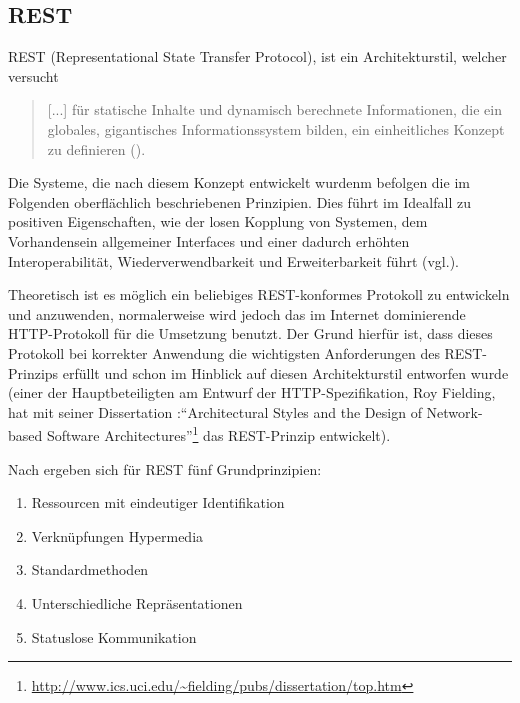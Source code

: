 \subsection{REST}\label{section:rest}
REST (Representational State Transfer Protocol), ist ein Architekturstil, welcher versucht 
\begin{quotation}
[...] für statische Inhalte und dynamisch berechnete Informationen, die ein globales, gigantisches Informationssystem bilden, ein einheitliches Konzept zu definieren (\cite{tilkovrestchapter2}).
\end{quotation}
Die Systeme, die nach diesem Konzept entwickelt wurdenm befolgen die im Folgenden oberflächlich beschriebenen Prinzipien. Dies führt im Idealfall zu positiven Eigenschaften, wie der losen Kopplung von Systemen, dem Vorhandensein allgemeiner Interfaces und einer dadurch erhöhten Interoperabilität, Wiederverwendbarkeit und Erweiterbarkeit führt (vgl.\cite{tilkovrestchapter2}).

Theoretisch ist es möglich ein beliebiges REST-konformes Protokoll zu entwickeln und anzuwenden, normalerweise wird jedoch das im Internet dominierende HTTP-Protokoll für die Umsetzung benutzt. Der Grund hierfür ist, dass dieses Protokoll bei korrekter Anwendung die wichtigsten Anforderungen des REST-Prinzips erfüllt und schon im Hinblick auf diesen Architekturstil entworfen wurde (einer der Hauptbeteiligten am Entwurf der HTTP-Spezifikation, Roy Fielding, hat mit seiner Dissertation :"`Architectural Styles and the Design of Network-based Software Architectures"'\footnote{\url{http://www.ics.uci.edu/~fielding/pubs/dissertation/top.htm}} das REST-Prinzip entwickelt). 

Nach \cite{tilkovrestchapter2} ergeben sich für REST fünf Grundprinzipien:
\begin{enumerate}
 \item\label{enumerate_rest_principles:1} Ressourcen mit eindeutiger Identifikation
 \item\label{enumerate_rest_principles:2} Verknüpfungen Hypermedia
 \item\label{enumerate_rest_principles:3} Standardmethoden
 \item\label{enumerate_rest_principles:4} Unterschiedliche Repräsentationen
 \item\label{enumerate_rest_principles:5} Statuslose Kommunikation
\end{enumerate}

